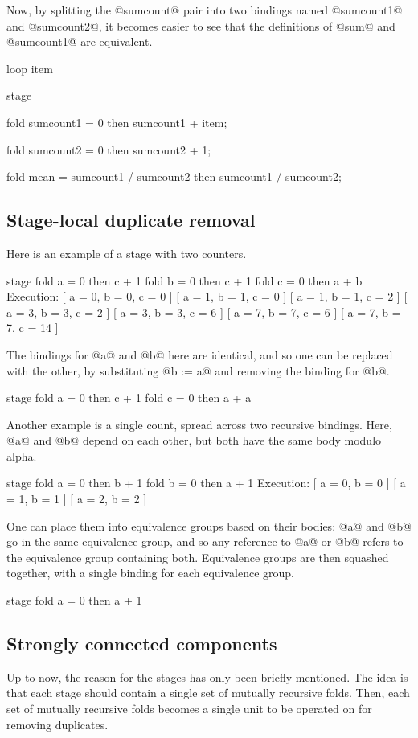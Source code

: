 Now, by splitting the @sumcount@ pair into two bindings named @sumcount1@ and @sumcount2@, it becomes easier to see that the definitions of @sum@ and @sumcount1@ are equivalent.
\begin{code}
loop item {
  stage {
    fold sumcount1
     = 0
     then
       sumcount1 + item;

    fold sumcount2
     = 0
     then
       sumcount2 + 1;

    fold mean
     = sumcount1 / sumcount2
     then
       sumcount1 / sumcount2;
  }
}
\end{code}


\subsection{Stage-local duplicate removal}
Here is an example of a stage with two counters.
\begin{code}
stage {
  fold a = 0 then c + 1
  fold b = 0 then c + 1
  fold c = 0 then a + b
}
Execution:
[ a = 0, b = 0, c = 0 ]
[ a = 1, b = 1, c = 0 ]
[ a = 1, b = 1, c = 2 ]
[ a = 3, b = 3, c = 2 ]
[ a = 3, b = 3, c = 6 ]
[ a = 7, b = 7, c = 6 ]
[ a = 7, b = 7, c = 14 ]
\end{code}

The bindings for @a@ and @b@ here are identical, and so one can be replaced with the other, by substituting @b := a@ and removing the binding for @b@.
\begin{code}
stage {
  fold a = 0 then c + 1
  fold c = 0 then a + a
}
\end{code}

Another example is a single count, spread across two recursive bindings.
Here, @a@ and @b@ depend on each other, but both have the same body modulo alpha.
\begin{code}
stage {
  fold a = 0 then b + 1
  fold b = 0 then a + 1
}
Execution:
[ a = 0, b = 0 ]
[ a = 1, b = 1 ]
[ a = 2, b = 2 ]
\end{code}

One can place them into equivalence groups based on their bodies: @a@ and @b@ go in the same equivalence group, and so any reference to @a@ or @b@ refers to the equivalence group containing both.
Equivalence groups are then squashed together, with a single binding for each equivalence group.
\begin{code}
stage {
  fold a = 0 then a + 1
}
\end{code}




\subsection{Strongly connected components}
Up to now, the reason for the stages has only been briefly mentioned.
The idea is that each stage should contain a single set of mutually recursive folds.
Then, each set of mutually recursive folds becomes a single unit to be operated on for removing duplicates.

